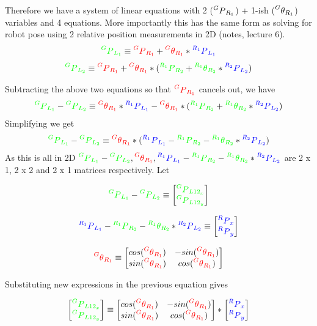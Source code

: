\documentclass[12pt]{article}
\newcommand{\xpy}[2]{\prescript{#1}{}{P}_{#2}}
\newcommand{\rxpy}[2]{{\color{red} \prescript{#1}{}{P}_{#2}}}
\newcommand{\gxpy}[2]{{\color{green} \prescript{#1}{}{P}_{#2}}}
\newcommand{\bxpy}[2]{{\color{blue} \prescript{#1}{}{P}_{#2}}}
\newcommand{\xoy}[2]{\prescript{#1}{}{\theta}_{#2}}
\newcommand{\rxoy}[2]{{\color{red} \prescript{#1}{}{\theta}_{#2}}}
\newcommand{\gxoy}[2]{{\color{green} \prescript{#1}{}{\theta}_{#2}}}
\begin{document}
Therefore we have a system of linear equations with 2 ($\xpy{G}{R_1}$) + 1-ish ($\xoy{G}{R_1}$) variables and 4 equations. More importantly this has the same form as solving for robot pose using 2 relative position measurements in 2D (notes, lecture 6).
\[
  \gxpy{G}{L_1} \equiv \rxpy{G}{R_1} + \rxoy{G}{R_1} * \bxpy{R_1}{L_1}
\]
\[
  \gxpy{G}{L_2} \equiv \rxpy{G}{R_1} + \rxoy{G}{R_1} * (\gxpy{R_1}{R_2} + \gxoy{R_1}{R_2} * \bxpy{R_2}{L_2})
\]

Subtracting the above two equations so that $ \rxpy{G}{R_1} $ cancels out, we have
\[
  \gxpy{G}{L_1} - \gxpy{G}{L_2} \equiv \rxoy{G}{R_1} * \bxpy{R_1}{L_1} - \rxoy{G}{R_1} * (\gxpy{R_1}{R_2} + \gxoy{R_1}{R_2} * \bxpy{R_2}{L_2})
\]
Simplifying we get
\[
  \gxpy{G}{L_1} - \gxpy{G}{L_2} \equiv \rxoy{G}{R_1} * (\bxpy{R_1}{L_1} - \gxpy{R_1}{R_2} - \gxoy{R_1}{R_2} * \bxpy{R_2}{L_2})
\]
As this is all in 2D $ \gxpy{G}{L_1} - \gxpy{G}{L_2}, \rxoy{G}{R_1}, \bxpy{R_1}{L_1} - \gxpy{R_1}{R_2} - \gxoy{R_1}{R_2} * \bxpy{R_2}{L_2} $ are 2 x 1, 2 x 2 and 2 x 1 matrices respectively. Let

\[
  \gxpy{G}{L_1} - \gxpy{G}{L_2} \equiv \begin{bmatrix} \gxpy{G}{L12_{x}} \\ \gxpy{G}{L12_{y}} \end{bmatrix}
\]

\[
  \bxpy{R_1}{L_1} - \gxpy{R_1}{R_2} - \gxoy{R_1}{R_2} * \bxpy{R_2}{L_2} \equiv \begin{bmatrix} \bxpy{R}{x} \\ \bxpy{R}{y} \end{bmatrix}
\]

\[
  \rxoy{G}{R_1} \equiv \begin{bmatrix} cos(\rxoy{G}{R_1}) & -sin(\rxoy{G}{R_1}) \\ sin(\rxoy{G}{R_1}) & cos(\rxoy{G}{R_1}) \end{bmatrix}
\]

Substituting new expressions in the previous equation gives

\[
\begin{bmatrix} \gxpy{G}{L12_{x}} \\ \gxpy{G}{L12_{y}} \end{bmatrix}
  \equiv
  \begin{bmatrix} cos(\rxoy{G}{R_1}) & -sin(\rxoy{G}{R_1}) \\ sin(\rxoy{G}{R_1}) & cos(\rxoy{G}{R_1}) \end{bmatrix}
  *
  \begin{bmatrix} \bxpy{R}{x} \\ \bxpy{R}{y} \end{bmatrix}
\]
\end{document}
